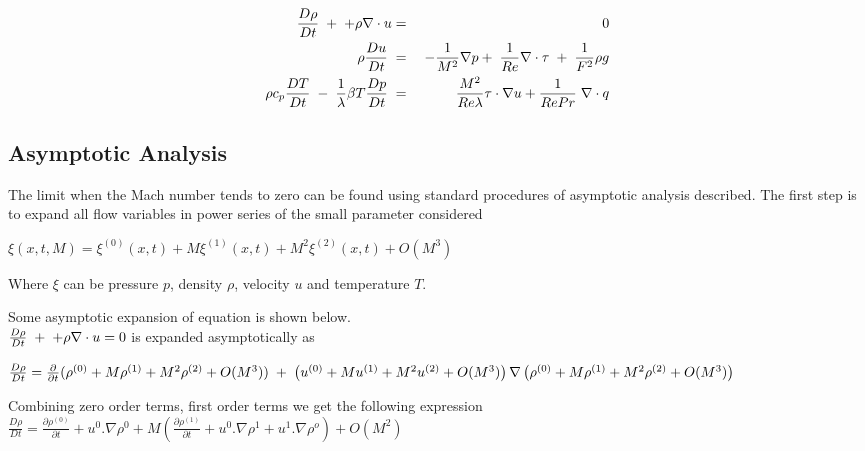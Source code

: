 \documentclass[11pt,a4paper]{article}
\begin{document}
\begin{eqnarray}
\frac{D \rho}{D t}\hspace{1mm}+\hspace{1mm}+ \rho \nabla\cdot u &=& 0 \\
\rho\frac{D u}{D t}\hspace{1mm} &=&\hspace{1mm}-\frac{1}{M^2}\nabla p +\hspace{1mm}\frac{1}{Re}\nabla\cdot\tau \hspace{1mm}+\hspace{1mm}\frac{1}{F^2} \rho g \\
 \rho c_p \frac{D T}{D t}\hspace{1mm}-\hspace{1mm}\frac{1}{\lambda} \beta T \frac{D p}{D t} \hspace{1mm} &=& \hspace{1mm} \frac{M^2}{Re \lambda} \tau \cdot\nabla u  + \frac{1}{RePr} \hspace{1mm} \nabla \cdot q
\end{eqnarray}

\subsection{Asymptotic Analysis}

The limit when the Mach number tends to zero can be found using standard
procedures of asymptotic analysis described. The first step
is to expand all flow variables in power series of the small parameter considered 

$\xi(x,t,M)=\xi^{(0)}(x,t)+M\xi^{(1)}(x,t)+M^2\xi^{(2)}(x,t)+ O(M^3)$

Where $\xi$ can be pressure $p$, density $\rho$, velocity $u$ and temperature $T$. 

Some asymptotic expansion of equation is shown below. \\

$\frac{D \rho}{D t}\hspace{1mm}+\hspace{1mm}+ \rho \nabla\cdot u = 0$ is expanded asymptotically as 

$\frac{D \rho}{D t}=\frac{\partial}{\partial t}(\rho^{(0)}+M\rho^{(1)}+M^2\rho^{(2)}+O(M^3))\hspace{1mm}+\hspace{1mm} \left( u^{(0)}+Mu^{(1)}+M^2u^{(2)}+O(M^3)\right) \nabla \left( \rho^{(0)}+M\rho^{(1)}+M^2\rho^{(2)}+O(M^3) \right)$

Combining zero order terms, first order terms we get the following expression \\
$\frac{D \rho}{D t} = \frac{\partial \rho^{(0)}}{\partial t} + u^0.\nabla \rho^0 + M \left( \frac{\partial \rho^{(1)}}{\partial t} + u^0.\nabla \rho^1 + u^1.\nabla \rho^o \right) + O(M^2)$
\end{document}
